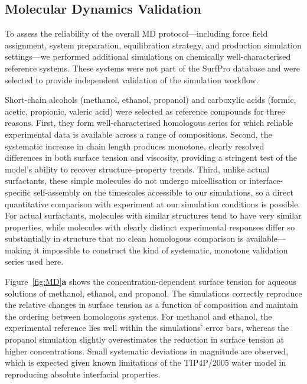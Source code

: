 \documentclass[11pt]{aime}
\begin{document}
\subsection{Molecular Dynamics Validation}
\label{sec:results:molecular_dynamics}

To assess the reliability of the overall MD protocol—including force field assignment, system preparation, equilibration strategy, and production simulation settings—we performed additional simulations on chemically well-characterised reference systems.
These systems were not part of the SurfPro database and were selected to provide independent validation of the simulation workflow.

Short-chain alcohols (methanol, ethanol, propanol) and carboxylic acids (formic, acetic, propionic, valeric acid) were selected as reference compounds for three reasons.
First, they form well-characterised homologous series for which reliable experimental data is available across a range of compositions.
Second, the systematic increase in chain length produces monotone, clearly resolved differences in both surface tension and viscosity, providing a stringent test of the model's ability to recover structure--property trends.
Third, unlike actual surfactants, these simple molecules do not undergo micellisation or interface-specific self-assembly on the timescales accessible to our simulations, so a direct quantitative comparison with experiment at our simulation conditions is possible.
For actual surfactants, molecules with similar structures tend to have very similar properties, while molecules with clearly distinct experimental responses differ so substantially in structure that no clean homologous comparison is available---making it impossible to construct the kind of systematic, monotone validation series used here.

Figure~\ref{fig:MD}\textbf{a} shows the concentration-dependent surface tension for aqueous solutions of methanol, ethanol, and propanol.
The simulations correctly reproduce the relative changes in surface tension as a function of composition and maintain the ordering between homologous systems.
For methanol and ethanol, the experimental reference lies well within the simulations' error bars, whereas the propanol simulation slightly overestimates the reduction in surface tension at higher concentrations.
Small systematic deviations in magnitude are observed, which is expected given known limitations of the TIP4P/2005 water model in reproducing absolute interfacial properties.
\end{document}
